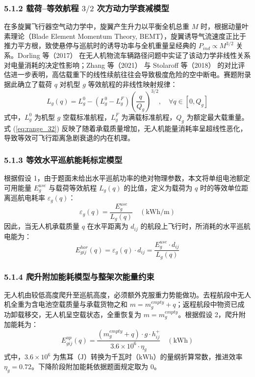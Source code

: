 \documentclass[12pt,a4paper,UTF8]{ctexart}
\begin{document}
\subsubsection{5.1.2 载荷--等效航程 $3/2$ 次方动力学衰减模型}
在多旋翼飞行器空气动力学中，旋翼产生升力以平衡全机总重 $M$ 时，根据动量叶素理论（Blade Element Momentum Theory, BEMT），旋翼诱导气流速度正比于推力平方根，致使悬停与巡航时的诱导功率与全机重量呈经典的 $P_{ind} \propto M^{3/2}$ 关系\cite{leishman2006}。Dorling 等（2017）\cite{dorling2017} 在无人机物流车辆路径问题中实证了该动力学非线性关系对电量消耗的决定性影响；Zhang 等（2021）\cite{zhang2021} 与 Stolaroff 等（2018）\cite{stolaroff2018} 的对比评估进一步表明，高估载重下的线性续航往往会导致极度危险的空中断电。赛题附录据此确立了载荷 $q$ 对机型 $g$ 等效航程的非线性映射规律：
\begin{equation}
L_g(q) = L_g^0 - (L_g^0 - L_g^F) \left(\frac{q}{Q_g}\right)^{3/2}, \quad \forall q \in [0, Q_g]
\label{eq:range_32}
\end{equation}
式中，$L_g^0$ 为机型 $g$ 空载标准航程，$L_g^F$ 为满载标准航程，$Q_g$ 为额定最大载重量。式 (\ref{eq:range_32}) 反映了随着承载质量增加，无人机能量消耗率呈超线性恶化，导致等效可飞行距离急剧衰退的内在机理。

\subsubsection{5.1.3 等效水平巡航能耗标定模型}
根据假设 1，由于题面未给出水平巡航功率的绝对物理参数，本文将单组电池额定可用能量 $E_g^{use}$ 与载荷等效航程 $L_g(q)$ 的比值，定义为载荷为 $q$ 时的等效单位距离巡航电耗率 $\varepsilon_g(q)$：
\begin{equation}
\varepsilon_g(q) = \frac{E_g^{use}}{L_g(q)} \quad (\text{kWh/m})
\end{equation}
因此，当无人机承载质量 $q$ 在水平距离为 $d_{ij}$ 的航段上飞行时，所消耗的水平巡航电能为：
\begin{equation}
E_{gij}^{hor}(q) = \varepsilon_g(q) \cdot d_{ij} = \frac{E_g^{use} \cdot d_{ij}}{L_g(q)}
\end{equation}

\subsubsection{5.1.4 爬升附加能耗模型与整架次能量约束}
无人机由较低高度爬升至巡航高度，必须额外克服重力势能做功。去程航段中无人机全重为含电池空载质量与承载货物之和 $m = m_g^{empty} + q$；返程航段中物资已成功卸载移交，无人机呈空载状态，全重恢复为 $m = m_g^{empty}$。根据假设 2，爬升附加能耗为：
\begin{equation}
E_{gij}^{up}(q) = \frac{(m_g^{empty} + q) \cdot g \cdot h_{ij}^+}{3.6 \times 10^6 \cdot \eta_g} \quad (\text{kWh})
\end{equation}
式中，$3.6 \times 10^6$ 为焦耳（$\text{J}$）转换为千瓦时（$\text{kWh}$）的量纲折算常数，推进效率 $\eta_g = 0.72$。下降阶段附加能耗依据题面规定取为 0。
\end{document}
